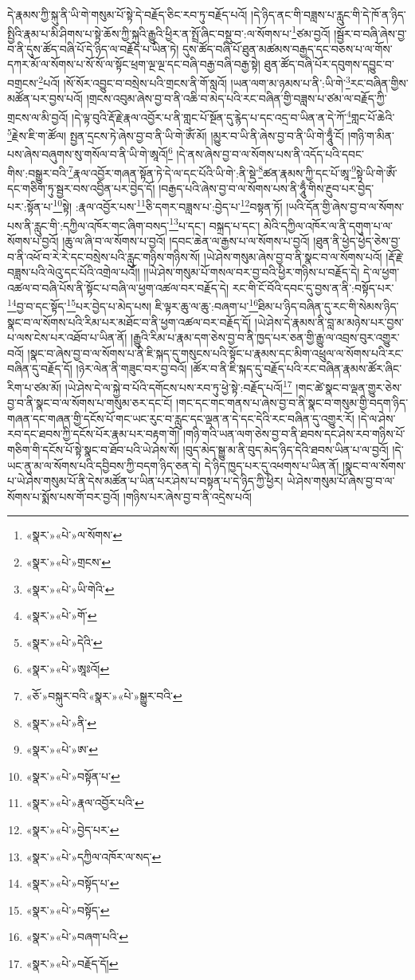 དེ་རྣམས་ཀྱི་སྐུ་ནི་ཡི་གེ་གསུམ་པོ་སྟེ་དེ་བརྗོད་ཅིང་རབ་ཏུ་བརྗོད་པའོ། །དེ་ཉིད་ནང་གི་བཟླས་པ་རླུང་གི་དེ་ཁོ་ན་ཉིད་སྤྱིའི་རྣམ་པ་མི་ཤིགས་པ་སྟེ་ཆོས་ཀྱི་སྐུའི་རྒྱུའི་ཕྱིར་ན་སྤྲོ་ཞིང་བསྡུ་བ་:ལ་སོགས་པ་\footnote{«སྣར་»«པེ་»ལ་སོགས་}ཙམ་བྱའོ། །སྦྱོར་བ་བཞི་ཞེས་བྱ་བ་ནི་དུས་ཚོད་བཞི་པོ་དེ་ཉིད་ལ་བརྗོད་པ་ཡིན་ཏེ། དུས་ཚོད་བཞི་པོ་ཐུན་མཚམས་བརྒྱད་དང་བཅས་པ་ལ་གོས་དཀར་མོ་ལ་སོགས་པ་སོ་སོ་ལ་སྟོང་ཕྲག་ལྔ་ལྔ་དང་བཞི་བརྒྱ་བཞི་བརྒྱ་སྟེ། ཐུན་ཚོད་བཞི་པོར་དབུགས་དབྱུང་བ་བགྲངས་\footnote{«སྣར་»«པེ་»གྲངས་}པའོ། །སོ་སོར་འབྱུང་བ་བསྲེས་པའི་གྲངས་ནི་གོ་སླའོ། །ཡན་ལག་མ་ཉམས་པ་ནི་:ཡི་གེ་\footnote{«སྣར་»«པེ་»ཡི་གེའི་}རང་བཞིན་གྱིས་མཚོན་པར་བྱས་པའོ། །གྲངས་འབུམ་ཞེས་བྱ་བ་ནི་འཆི་བ་མེད་པའི་རང་བཞིན་གྱི་བཟླས་པ་ཙམ་ལ་བརྗོད་ཀྱི་གྲངས་ལ་མི་བྱའོ། །དེ་ལྟ་བུའི་རྡོ་རྗེ་རྣལ་འབྱོར་པ་ནི་གླང་པོ་སྔོན་དུ་རྙེད་པ་དང་འདྲ་བ་ཡིན་ན་དེ་ཀོ་\footnote{«སྣར་»«པེ་»གོ་}གླང་པོ་ཆེའི་\footnote{«སྣར་»«པེ་»དེའི་}རྗེས་ཇི་ག་ཚོལ། སྤྱན་དྲངས་ཏེ་ཞེས་བྱ་བ་ནི་ཡི་གེ་ཨོཾ་མོ། །མྱུར་བ་ཡི་ནི་ཞེས་བྱ་བ་ནི་ཡི་གེ་ཧཱུྃ་ངོ། །གཉི་ག་མིན་པས་ཞེས་བཞུགས་སུ་གསོལ་བ་ནི་ཡི་གེ་ཨཱའོ།\footnote{«སྣར་»«པེ་»ཨཱཿའོ།} །དེ་ནས་ཞེས་བྱ་བ་ལ་སོགས་པས་ནི་འདོད་པའི་དབང་གིས་:བསྒྱུར་བའི་\footnote{«ཅོ་»བསྐུར་བའི་«སྣར་»«པེ་»སྒྱུར་བའི་}རྣལ་འབྱོར་གཞན་སྟོན་ཏེ་དེ་ལ་དང་པོའི་ཡི་གེ་:ནི་སྡེ་\footnote{«སྣར་»«པེ་»ནི་}ཚན་རྣམས་ཀྱི་དང་པོ་ཨཱ་\footnote{«སྣར་»«པེ་»ཨ་}སྟེ་ཡི་གེ་ཨོཾ་དང་གཅིག་ཏུ་སྦྱར་བས་འབྱིན་པར་བྱེད་དོ། །བརྒྱད་པའི་ཞེས་བྱ་བ་ལ་སོགས་པས་ནི་ཧཱུྃ་གིས་རྔུབ་པར་བྱེད་པར་:སྟོན་པ་\footnote{«སྣར་»«པེ་»བསྟོན་པ་}སྟེ། :རྣལ་འབྱོར་པས་\footnote{«སྣར་»«པེ་»རྣལ་འབྱོར་པའི་}ཅི་དགར་བཟླས་པ་:བྱེད་པ་\footnote{«སྣར་»«པེ་»བྱེད་པར་}བསྟན་ཏོ། །ཡའི་དོན་གྱི་ཞེས་བྱ་བ་ལ་སོགས་པས་ནི་རླུང་གི་:དཀྱིལ་འཁོར་གང་ཞིག་བསད་\footnote{«སྣར་»«པེ་»དཀྱིལ་འཁོར་ལ་སད་}པ་དང་། བསྐྲད་པ་དང་། མེའི་དཀྱིལ་འཁོར་ལ་ནི་དགུག་པ་ལ་སོགས་པ་བྱའོ། །ཆུ་ལ་ཞི་བ་ལ་སོགས་པ་བྱའོ། །དབང་ཆེན་ལ་རྒྱས་པ་ལ་སོགས་པ་བྱའོ། །ཐུན་ནི་ཕྱེད་ཕྱེད་ཅེས་བྱ་བ་ནི་འཕོ་བ་རེ་རེ་དང་བསྲེས་པའི་རླུང་གཉིས་གཉིས་སོ། །ཡེ་ཤེས་གསུམ་ཞེས་བྱ་བ་ནི་སྣང་བ་ལ་སོགས་པའོ། །རྡོ་རྗེ་བཟླས་པའི་ལེའུ་དང་པོའི་འགྲེལ་པའོ།། །།ཡེ་ཤེས་གསུམ་པོ་གསལ་བར་བྱ་བའི་ཕྱིར་གཉིས་པ་བརྗོད་དེ། དེ་ལ་ཕྱག་འཚལ་བ་བཞི་པོས་ནི་སྟོང་པ་བཞི་ལ་ཕྱག་འཚལ་བར་བརྗོད་དེ། རང་གི་ངོ་བོའི་དབང་དུ་བྱས་ན་ནི་:བསྟོད་པར་\footnote{«སྣར་»«པེ་»བསྟོད་པ་}བྱ་བ་དང་སྟོད་\footnote{«སྣར་»«པེ་»བསྟོད་}པར་བྱེད་པ་མེད་པས། ཇི་ལྟར་ཆུ་ལ་ཆུ་:བཞག་པ་\footnote{«སྣར་»«པེ་»བཞག་པའི་}ཐིམ་པ་ཉིད་བཞིན་དུ་རང་གི་སེམས་ཉིད་སྣང་བ་ལ་སོགས་པའི་རིམ་པར་མཐོང་བ་ནི་ཕྱག་འཚལ་བར་བརྗོད་དོ། །ཡེ་ཤེས་དེ་རྣམས་ནི་བླ་མ་མཉེས་པར་བྱས་པ་ལས་ངེས་པར་འཐོབ་པ་ཡིན་ནོ། །རྒྱུའི་རིམ་པ་རྣམ་དག་ཅེས་བྱ་བ་ནི་ཁྱད་པར་ཅན་གྱི་རྒྱུ་ལ་འབྲས་བུར་འགྱུར་བའོ། །སྣང་བ་ཞེས་བྱ་བ་ལ་སོགས་པ་ནི་ཇི་སྐད་དུ་གསུངས་པའི་སྟོང་པ་རྣམས་དང་མིག་འཕྲུལ་ལ་སོགས་པའི་རང་བཞིན་དུ་བརྗོད་དོ། །ཉེར་ལེན་ནི་གཟུང་བར་བྱ་བའོ། །ཚོར་བ་ནི་ཇི་སྐད་དུ་བརྗོད་པའི་རང་བཞིན་རྣམས་ཚོར་ཞིང་རིག་པ་ཙམ་མོ། །ཡེ་ཤེས་དེ་ལ་སྐྱེ་བ་པོའི་དགོངས་པས་རབ་ཏུ་ཕྱེ་སྟེ་:བརྗོད་པའོ།\footnote{«སྣར་»«པེ་»བརྗོད་དོ།} །གང་ཚེ་སྣང་བ་ལྡན་གྱུར་ཅེས་བྱ་བ་ནི་སྣང་བ་ལ་སོགས་པ་གསུམ་ཅར་དང་ངོ། །གང་དང་གང་གནས་པ་ཞེས་བྱ་བ་ནི་སྣང་བ་གསུམ་གྱི་བདག་ཉིད་གཞན་དང་གཞན་གྱི་དངོས་པོ་གང་ཡང་རུང་བ་རླུང་དང་ལྡན་ན་དེ་དང་དེའི་རང་བཞིན་དུ་འགྱུར་རོ། །དེ་ལ་ཤེས་རབ་དང་ཐབས་ཀྱི་དངོས་པོར་རྣམ་པར་བརྟག་གོ། །གཉི་གའི་ཡན་ལག་ཅེས་བྱ་བ་ནི་ཐབས་དང་ཤེས་རབ་གཉིས་པོ་གཅིག་གི་དངོས་པོ་སྟེ་སྣང་བ་ཐོབ་པའི་ཡེ་ཤེས་སོ། །བུད་མེད་སྒྱུ་མ་ནི་བུད་མེད་ཉིད་དེའི་ཐབས་ཡིན་པ་ལ་བྱའོ། །དེ་ཡང་ནུ་མ་ལ་སོགས་པའི་དབྱིབས་ཀྱི་བདག་ཉིད་ཅན་དེ། དེ་ཉིད་ཁྱད་པར་དུ་འཕགས་པ་ཡིན་ནོ། །སྣང་བ་ལ་སོགས་པ་ཡེ་ཤེས་གསུམ་པོ་ནི་དེས་མཚོན་པ་ཡིན་པར་ཤེས་པ་བསྟན་པ་དེ་ཉིད་ཀྱི་ཕྱིར། ཡེ་ཤེས་གསུམ་པོ་ཞེས་བྱ་བ་ལ་སོགས་པ་སྨོས་པས་གོ་བར་བྱའོ། །གཉིས་པར་ཞེས་བྱ་བ་ནི་འདྲེས་པའོ། 